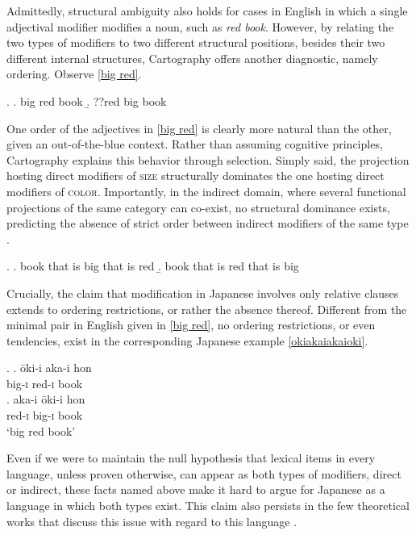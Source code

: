 Admittedly, structural ambiguity also holds for cases in  English in which a single adjectival modifier modifies a noun, such as \textit{red book}. However, by relating the two types of modifiers to two different structural positions, besides their two different internal structures, Cartography offers another diagnostic, namely ordering. Observe \ref{big red}. 

\ex. \label{big red} \a. big red book
\b. ??red big book

One order of the adjectives in \ref{big red} is clearly more natural than the other, given an out-of-the-blue context. Rather than assuming cognitive principles, Cartography explains this behavior through selection. Simply said, the projection hosting direct modifiers of \textsc{size} structurally dominates the one hosting direct modifiers of \textsc{color}. Importantly, in the indirect domain, where several functional projections of the same category can co-exist, no structural dominance exists, predicting the absence of strict order between indirect modifiers of the same type \citep{sproat:1991:the, baker:2003:verbal}. 

\ex. \a. book that is big that is red
\b. book that is red that is big

Crucially, the claim that modification in Japanese involves only relative clauses extends to ordering restrictions, or rather the absence thereof. Different from the minimal pair in English given in \ref{big red}, no ordering restrictions, or even tendencies, exist in the corresponding Japanese example \ref{okiakaiakaioki}.

\ex. \label{okiakaiakaioki} \ag. ōki-i aka-i hon\\
big-\textsc{i} red-\textsc{i} book\\
\bg. aka-i ōki-i hon\\
red-\textsc{i} big-\textsc{i} book\\
`big red book’

Even if we were to maintain the null hypothesis that lexical items in every language, unless proven otherwise, can appear as both types of modifiers, direct or indirect, these facts named above make it hard to argue for Japanese as a language in which both types exist. This claim also persists in the few theoretical works that discuss this issue with regard to this language \citep{sproat:1991:the, baker:2003:verbal, laenzlinger:2011:elements}.

